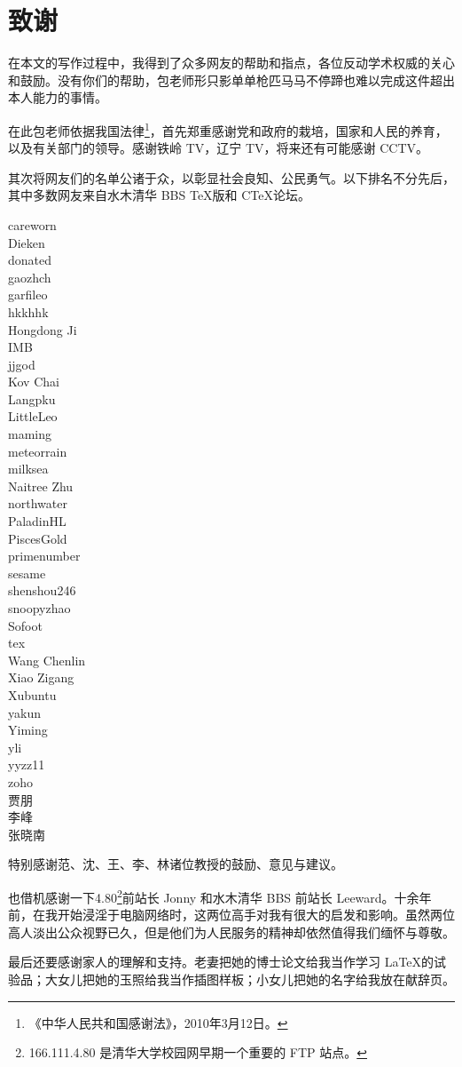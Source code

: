 \chapter{致谢}

在本文的写作过程中，我得到了众多网友的帮助和指点，各位反动学术权威的关心和鼓励。没有你们的帮助，包老师形只影单单枪匹马马不停蹄也难以完成这件超出本人能力的事情。

在此包老师依据我国法律\footnote{《中华人民共和国感谢法》，2010年3月12日。}，首先郑重感谢党和政府的栽培，国家和人民的养育，以及有关部门的领导。感谢铁岭 TV，辽宁 TV，将来还有可能感谢 CCTV。

其次将网友们的名单公诸于众，以彰显社会良知、公民勇气。以下排名不分先后，其中多数网友来自水木清华 BBS \TeX 版和 C\TeX 论坛。

\begin{multicols}{3}
\noindent
careworn\\
Dieken\\
donated\\
gaozhch\\
garfileo\\
hkkhhk\\
Hongdong Ji\\
IMB\\
jjgod\\
Kov Chai\\
Langpku\\
LittleLeo\\
maming\\
meteorrain\\
milksea\\
Naitree Zhu\\
northwater\\
PaladinHL\\
PiscesGold\\
primenumber\\
sesame\\
shenshou246\\
snoopyzhao\\
Sofoot\\
tex\\
Wang Chenlin\\
Xiao Zigang\\
Xubuntu\\
yakun\\
Yiming\\
yli\\
yyzz11\\
zoho\\
贾朋\\
李峰\\
张晓南
\end{multicols}

特别感谢范、沈、王、李、林诸位教授的鼓励、意见与建议。

也借机感谢一下4.80\footnote{166.111.4.80 是清华大学校园网早期一个重要的 FTP 站点。}前站长 Jonny 和水木清华 BBS 前站长 Leeward。十余年前，在我开始浸淫于电脑网络时，这两位高手对我有很大的启发和影响。虽然两位高人淡出公众视野已久，但是他们为人民服务的精神却依然值得我们缅怀与尊敬。

最后还要感谢家人的理解和支持。老妻把她的博士论文给我当作学习 \LaTeX 的试验品；大女儿把她的玉照给我当作插图样板；小女儿把她的名字给我放在献辞页。
